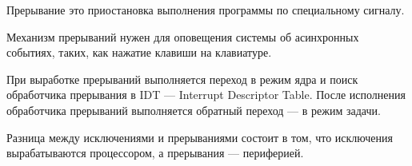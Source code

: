 \begin{defi}{Прерывание}
	это приостановка выполнения программы по специальному сигналу.
\end{defi}

Механизм прерываний нужен для оповещения системы об асинхронных событиях, таких, как нажатие клавиши на клавиатуре.

При выработке прерываний выполняется переход в режим ядра и поиск обработчика прерывания в IDT --- Interrupt Descriptor Table. После исполнения обработчика прерываний выполняется обратный переход --- в режим задачи.

Разница между исключениями и прерываниями состоит в том, что исключения вырабатываются процессором, а прерывания --- периферией.
